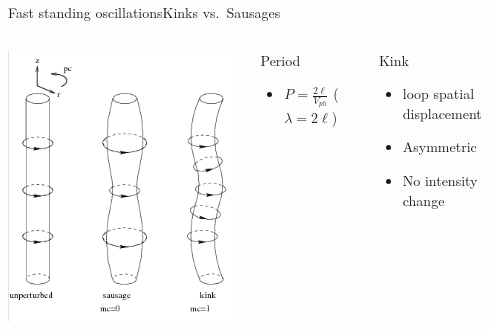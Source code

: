 \documentclass[11pt,table]{beamer}
\begin{document}
\begin{frame}{Fast standing oscillations}{Kinks vs.\ Sausages}
    \begin{columns}
            \includegraphics[width=\textwidth]{kink_saus.png}
        \column{0.5\paperwidth}
        \vspace{-0.5in}
        \begin{block}{Period}
            \begin{itemize}
                \item $P=\frac{2\ell}{V_{ph}}$
                    ($\lambda=2\ell$)
            \end{itemize}
        \end{block}
        \begin{block}{Kink}
            \begin{itemize}
                \item loop spatial displacement
                \item Asymmetric
                \item No intensity change

\end{itemize}
\end{block}
\end{columns}
\end{frame}
\end{document}
